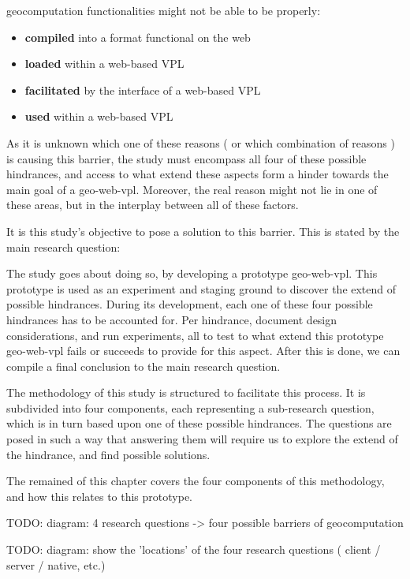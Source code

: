 geocomputation functionalities might not be able to be properly:
\begin{itemize}[-]
  \item \textbf{compiled} into a format functional on the web
  \item \textbf{loaded} within a web-based VPL
  \item \textbf{facilitated} by the interface of a web-based VPL
  \item \textbf{used} within a web-based VPL
\end{itemize}
As it is unknown which one of these reasons ( or which combination of reasons ) is causing this barrier, the study must encompass all four of these possible hindrances, and access to what extend these aspects form a hinder towards the main goal of a \ac{geo-web-vpl}. 
Moreover, the real reason might not lie in one of these areas, but in the interplay between all of these factors. 

It is this study's objective to pose a solution to this barrier. This is stated by the main research question: \myMainRQ 

The study goes about doing so, by developing a prototype \ac{geo-web-vpl}. 
This prototype is used as an experiment and staging ground to discover the extend of possible hindrances. 
During its development, each one of these four possible hindrances has to be accounted for. 
Per hindrance, document design considerations, and run experiments, all to test to what extend this prototype \ac{geo-web-vpl} fails or succeeds to provide for this aspect. 
After this is done, we can compile a final conclusion to the main research question. 

The methodology of this study is structured to facilitate this process. 
It is subdivided into four components, each representing a sub-research question, which is in turn based upon one of these possible hindrances. The questions are posed in such a way that answering them will require us to explore the extend of the hindrance, and find possible solutions.

The remained of this chapter covers the four components of this methodology, and how this relates to this prototype. 

\begin{note}
TODO: diagram: 4 research questions -> four possible barriers of geocomputation
\end{note}

\begin{note}
TODO: diagram: show the 'locations' of the four research questions ( client / server / native, etc.)
\end{note}

